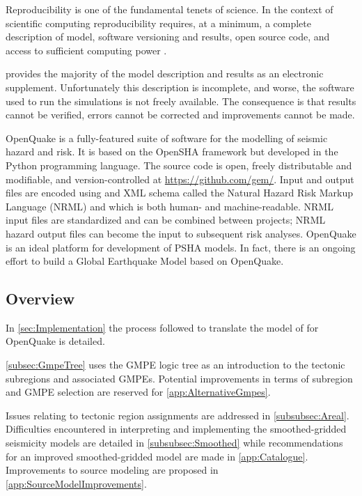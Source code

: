 \documentclass{article}
\begin{document}
Reproducibility is one of the fundamental tenets of science.
In the context of scientific computing reproducibility requires, at a minimum, a complete description of model, software versioning and results, open source code, and access to sufficient computing power \citep{hinsen2011data}.

\cite{nath2012probabilistic} provides the majority of the model description and results as an electronic supplement.
Unfortunately this description is incomplete, and worse, the software used to run the simulations is not freely available.
The consequence is that results cannot be verified, errors cannot be corrected and improvements cannot be made.

OpenQuake \citep{pagani2014openquake} is a fully-featured suite of software for the modelling of seismic hazard and risk. 
It is based on the OpenSHA framework \cite{field2003opensha} but developed in the Python programming language.
The source code is open, freely distributable and modifiable, and version-controlled at \url{https://github.com/gem/}.
Input and output files are encoded using and XML schema called the Natural Hazard Risk Markup Language (NRML) and which is both human- and machine-readable. 
NRML input files are standardized and can be combined between projects; NRML hazard output files can become the input to subsequent risk analyses.
OpenQuake is an ideal platform for development of PSHA models.
In fact, there is an ongoing effort to build a Global Earthquake Model based on OpenQuake.

\subsection{Overview}
\label{subsec:Overview}

In \autoref{sec:Implementation} the process followed to translate the model of \cite{nath2012probabilistic} for OpenQuake is detailed.

\autoref{subsec:GmpeTree} uses the GMPE logic tree as an introduction to the tectonic subregions and associated GMPEs. Potential improvements in terms of subregion and GMPE selection are reserved for \autoref{app:AlternativeGmpes}.

Issues relating to tectonic region assignments are addressed in \autoref{subsubsec:Areal}.
Difficulties encountered in interpreting and implementing the smoothed-gridded seismicity models are detailed in \autoref{subsubsec:Smoothed} while recommendations for an improved smoothed-gridded model are made in \autoref{app:Catalogue}. 
Improvements to source modeling are proposed in \autoref{app:SourceModelImprovements}.
\end{document}
